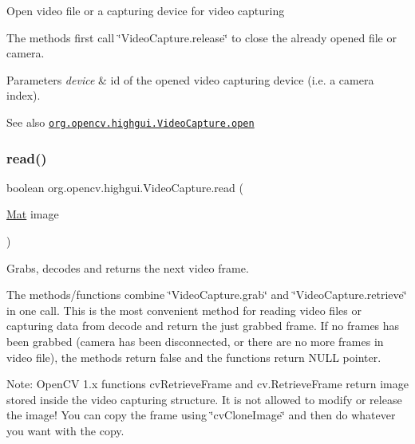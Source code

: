 Open video file or a capturing device for video capturing

The methods first call \char`\"{}\+Video\+Capture.\+release\char`\"{} to close the already opened file or camera.


\begin{DoxyParams}{Parameters}
{\em device} & id of the opened video capturing device (i.\+e. a camera index).\\
\hline
\end{DoxyParams}
\begin{DoxySeeAlso}{See also}
\href{http://docs.opencv.org/modules/highgui/doc/reading_and_writing_images_and_video.html#videocapture-open}{\tt org.\+opencv.\+highgui.\+Video\+Capture.\+open} 
\end{DoxySeeAlso}
\mbox{\label{classorg_1_1opencv_1_1highgui_1_1_video_capture_a33443c8030b858c185c586cf33a91883}} 
\subsubsection{\texorpdfstring{read()}{read()}}
{\footnotesize\ttfamily boolean org.\+opencv.\+highgui.\+Video\+Capture.\+read (\begin{DoxyParamCaption}\item[{\mbox{\hyperlink{classorg_1_1opencv_1_1core_1_1_mat}{Mat}}}]{image }\end{DoxyParamCaption})}

Grabs, decodes and returns the next video frame.

The methods/functions combine \char`\"{}\+Video\+Capture.\+grab\char`\"{} and \char`\"{}\+Video\+Capture.\+retrieve\char`\"{} in one call. This is the most convenient method for reading video files or capturing data from decode and return the just grabbed frame. If no frames has been grabbed (camera has been disconnected, or there are no more frames in video file), the methods return false and the functions return N\+U\+LL pointer.

Note\+: Open\+CV 1.\+x functions {\ttfamily cv\+Retrieve\+Frame} and {\ttfamily cv.\+Retrieve\+Frame} return image stored inside the video capturing structure. It is not allowed to modify or release the image! You can copy the frame using \char`\"{}cv\+Clone\+Image\char`\"{} and then do whatever you want with the copy.


